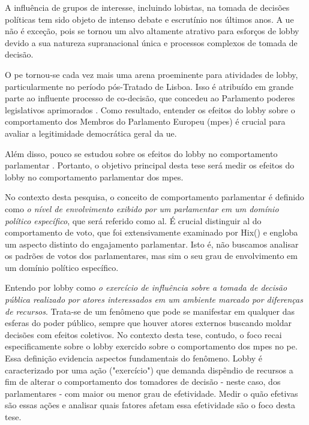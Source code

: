 
A influência de grupos de interesse, incluindo lobistas, na tomada de decisões políticas tem sido objeto de intenso debate e escrutínio nos últimos anos. A \acrfull{ue} não é exceção, pois se tornou um alvo altamente atrativo para esforços de lobby devido a sua natureza supranacional única e processos complexos de tomada de decisão.

O \acrfull{pe} tornou-se cada vez mais uma arena proeminente para atividades de lobby, particularmente no período pós-Tratado de Lisboa. Isso é atribuído em grande parte ao influente processo de co-decisão, que concedeu ao Parlamento poderes legislativos aprimorados \cite{Dionigi2017}. Como resultado, entender os efeitos do lobby sobre o comportamento dos Membros do Parlamento Europeu (\acrshort{mpe}s) é crucial para avaliar a legitimidade democrática geral da \acrshort{ue}.

Além disso, pouco se estudou sobre os efeitos do lobby no comportamento parlamentar \cite{Huwyler2022}. Portanto, o objetivo principal desta tese será medir os efeitos do lobby no comportamento parlamentar dos \acrshort{mpe}s.

No contexto desta pesquisa, o conceito de comportamento parlamentar é definido como \textit{o nível de envolvimento exibido por um parlamentar em um domínio político específico}, que será referido como \acrfull{al}. É crucial distinguir \acrshort{al} do comportamento de voto, que foi extensivamente examinado por Hix(\citeyear{Hix2002}) e engloba um aspecto distinto do engajamento parlamentar. Isto é, não buscamos analisar os padrões de votos dos parlamentares, mas sim o seu grau de envolvimento em um domínio político específico.

Entendo por lobby como \textit{o exercício de influência sobre a tomada de decisão pública realizado por atores interessados em um ambiente marcado por diferenças de recursos}. Trata-se de um fenômeno que pode se manifestar em qualquer das esferas do poder público, sempre que houver atores externos buscando moldar decisões com efeitos coletivos. No contexto desta tese, contudo, o foco recai especificamente sobre o lobby exercido sobre o comportamento dos \acrshort{mpe}s no \acrshort{pe}. Essa definição evidencia aspectos fundamentais do fenômeno. Lobby é caracterizado por uma ação ("exercício") que demanda dispêndio de recursos a fim de alterar o comportamento dos tomadores de decisão - neste caso, dos parlamentares - com maior ou menor grau de efetividade. Medir o quão efetivas são essas ações e analisar quais fatores afetam essa efetividade são o foco desta tese.

